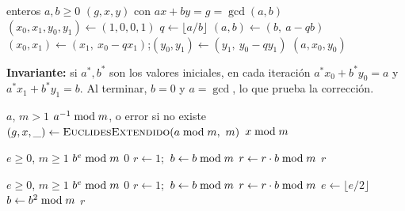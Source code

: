 \begin{algorithm}[H]
\caption{\textsc{EuclidesExtendido}$(a, b)$ \hfill iterativo}
\label{alg:euclides}
\begin{algorithmic}[1]
\Require enteros $a, b \ge 0$
\Ensure $(g, x, y)$ con $a x + b y = g = \gcd(a,b)$
\State $(x_0, x_1, y_0, y_1) \gets (1, 0, 0, 1)$
  \State $q \gets \lfloor a / b \rfloor$
  \State $(a, b) \gets (b,\ a - q b)$
  \State $(x_0, x_1) \gets (x_1,\ x_0 - q x_1)$;\quad $(y_0, y_1) \gets (y_1,\ y_0 - q y_1)$
\EndWhile
\State \Return $(a, x_0, y_0)$
\end{algorithmic}
\end{algorithm}

\noindent\textbf{Invariante:} si $a^\ast, b^\ast$ son los valores iniciales,
en cada iteración $a^\ast x_0 + b^\ast y_0 = a$ y $a^\ast x_1 + b^\ast y_1 = b$.
Al terminar, $b=0$ y $a=\gcd$, lo que prueba la corrección.

\begin{algorithm}[H]
\caption{\textsc{InversoModular}$(a, m)$}
\begin{algorithmic}[1]
\Require $a$, $m > 1$
\Ensure $a^{-1} \bmod m$, o error si no existe
\State $(g, x, \_) \gets \textsc{EuclidesExtendido}(a \bmod m,\ m)$
  \EndIf
\State \Return $x \bmod m$
\end{algorithmic}
\end{algorithm}

\begin{minipage}[t]{0.47\textwidth}
\begin{algorithm}[H]
\caption{\textsc{ExpIngenua}$(b, e, m)$}
\begin{algorithmic}[1]
\Require $e \ge 0$, $m \ge 1$
\Ensure $b^e \bmod m$
 \Return $0$ \EndIf
\State $r \gets 1$;\ $b \gets b \bmod m$
  \State $r \gets r \cdot b \bmod m$
\EndFor
\State \Return $r$
\end{algorithmic}
\end{algorithm}
\end{minipage}\hfill
\begin{minipage}[t]{0.49\textwidth}
\begin{algorithm}[H]
\caption{\textsc{ExpRápida}$(b, e, m)$}
\label{alg:exp}
\begin{algorithmic}[1]
\Require $e \ge 0$, $m \ge 1$
\Ensure $b^e \bmod m$
 \Return $0$ \EndIf
\State $r \gets 1$;\ $b \gets b \bmod m$
   $r \gets r \cdot b \bmod m$ \EndIf
  \State $e \gets \lfloor e/2 \rfloor$
   $b \gets b^2 \bmod m$ \EndIf
\EndWhile
\State \Return $r$
\end{algorithmic}
\end{algorithm}
\end{minipage}

